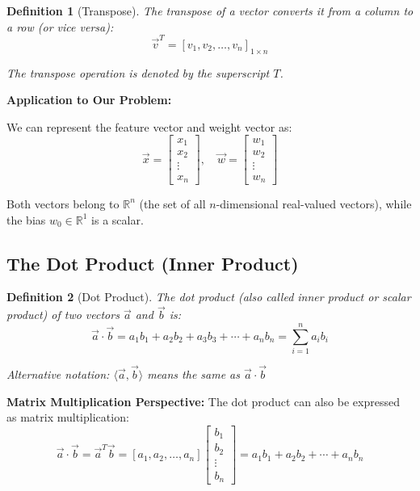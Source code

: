 \documentclass[12pt,a4paper]{article}
\theoremstyle{directpoint}
\newtheorem*{definition}{Definition}
\theoremstyle{definition}
\begin{document}
\begin{definition}[Transpose]
The transpose of a vector converts it from a column to a row (or vice versa):
\begin{equation}
\vec{v}^T = [v_1, v_2, \ldots, v_n]_{1 \times n}
\end{equation}

The transpose operation is denoted by the superscript $T$.
\end{definition}

\textbf{Application to Our Problem:}

We can represent the feature vector and weight vector as:
\begin{equation}
\vec{x} = \begin{bmatrix}
x_1 \\
x_2 \\
\vdots \\
x_n
\end{bmatrix}, \quad
\vec{w} = \begin{bmatrix}
w_1 \\
w_2 \\
\vdots \\
w_n
\end{bmatrix}
\end{equation}

Both vectors belong to $\mathbb{R}^n$ (the set of all $n$-dimensional real-valued vectors), while the bias $w_0 \in \mathbb{R}^1$ is a scalar.

\subsection{The Dot Product (Inner Product)}

\begin{definition}[Dot Product]
The dot product (also called inner product or scalar product) of two vectors $\vec{a}$ and $\vec{b}$ is:
\begin{equation}
\vec{a} \cdot \vec{b} = a_1b_1 + a_2b_2 + a_3b_3 + \cdots + a_nb_n = \sum_{i=1}^{n} a_ib_i
\end{equation}

Alternative notation: $\langle \vec{a}, \vec{b} \rangle$ means the same as $\vec{a} \cdot \vec{b}$
\end{definition}

\textbf{Matrix Multiplication Perspective:} The dot product can also be expressed as matrix multiplication:
\begin{equation}
\vec{a} \cdot \vec{b} = \vec{a}^T\vec{b} = [a_1, a_2, \ldots, a_n] \begin{bmatrix}
b_1 \\
b_2 \\
\vdots \\
b_n
\end{bmatrix} = a_1b_1 + a_2b_2 + \cdots + a_nb_n
\end{equation}
\end{document}
